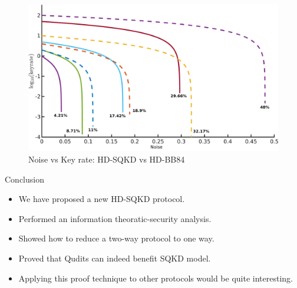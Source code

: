 \documentclass[final]{beamer}
\newlength{\onecolwid}
\begin{document}
\begin{frame}[t]
\begin{columns}[t]
\begin{column}{\onecolwid} %


\begin{figure}
	\includegraphics[width=\linewidth]{q_v_kr_to_label_done_small.png}
	\caption{Noise vs Key rate: HD-SQKD vs HD-BB84}
\end{figure}

\begin{block}{Conclusion}

\begin{itemize}
	\item We have proposed a new HD-SQKD protocol.
	\item Performed an information theoratic-security analysis. 
	\item Showed how to reduce a two-way protocol to one way. 
	\item Proved that Qudits can indeed benefit SQKD model. 
		\item Applying this proof technique to other protocols would be quite interesting. 
\end{itemize}

\end{block}

%
%
%


\end{column}
\end{columns}
\end{frame}
\end{document}
